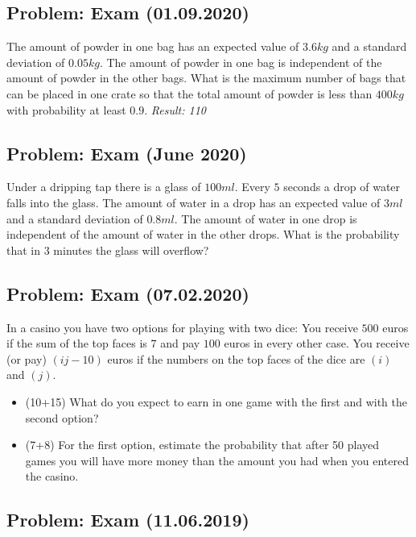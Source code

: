 \documentclass[a4paper, 12pt]{article}
\begin{document}
\subsection{Problem: Exam (01.09.2020)}

The amount of powder in one bag has an expected value of $3.6 kg$ and a standard deviation of $0.05 kg$. The amount of powder in one bag is independent of the amount of powder in the other bags. What is the maximum number of bags that can be placed in one crate so that the total amount of powder is less than $400 kg$ with probability at least $0.9$.
\textit{Result: {110}}


\subsection{Problem: Exam (June 2020)}

Under a dripping tap there is a glass of $100 ml$. Every $5$ seconds a drop of water falls into the glass. The amount of water in a drop has an expected value of $3 ml$ and a standard deviation of $0.8 ml$. The amount of water in one drop is independent of the amount of water in the other drops. What is the probability that in $3$ minutes the glass will overflow?

\subsection{Problem: Exam (07.02.2020)}

In a casino you have two options for playing with two dice:
You receive $500$ euros if the sum of the top faces is $7$ and pay $100$ euros in every other case.
You receive (or pay) $(ij - 10)$ euros if the numbers on the top faces of the dice are $(i)$ and $(j)$.
\begin{itemize}
  
\item [a)] (10+15) What do you expect to earn in one game with the first and with the second option?
\item [b)] (7+8) For the first option, estimate the probability that after 50 played games you will have more money than the amount you had when you entered the casino.

\end{itemize}



\subsection{Problem: Exam (11.06.2019)}
\end{document}
